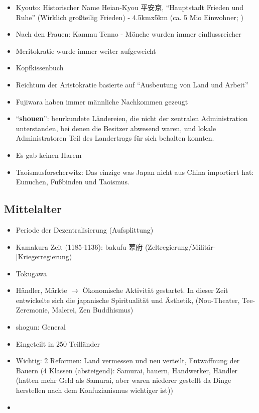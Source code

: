 \documentclass[emulatestandardclasses]{scrartcl}
\begin{document}
\begin{itemize}
  \item Kyouto: Historischer Name Heian-Kyou 平安京, "`Hauptstadt Frieden und Ruhe"' (Wirklich großteilig Frieden) - 4.5kmx5km (ca. 5 Mio Einwohner; )
  \item Nach den Frauen: Kammu Tenno - Mönche wurden immer einflussreicher
  \item Meritokratie wurde immer weiter aufgeweicht
  \item Kopfkissenbuch
  \item Reichtum der Aristokratie basierte auf "`Ausbeutung von Land und Arbeit"'
  \item Fujiwara haben immer männliche Nachkommen gezeugt
  \item "`\textbf{shouen}"': beurkundete Ländereien, die nicht der zentralen Administration unterstanden, bei denen die Besitzer abwesend waren, und lokale Administratoren Teil des Landertrags für sich behalten konnten.
  \item Es gab keinen Harem
  \item Taoismusforscherwitz: Das einzige was Japan nicht aus China importiert hat: Eunuchen, Fußbinden und Taoismus.
\end{itemize}

\subsection{Mittelalter}

\begin{itemize}
  \item Periode der Dezentralisierung (Aufsplittung)
  \item Kamakura Zeit (1185-1136): bakufu 幕府 (Zeltregierung/Militär-|Kriegerregierung)
  \item Tokugawa 
  \item Händler, Märkte $\rightarrow$ Ökonomische Aktivität gestartet. In dieser Zeit entwickelte sich die japanische Spiritualität und Ästhetik, (Nou-Theater, Tee-Zeremonie, Malerei, Zen Buddhismus)
  \item shogun: General
  \item Eingeteilt in 250 Teilländer
  \item Wichtig: 2 Reformen: Land vermessen und neu verteilt, Entwaffnung der Bauern (4 Klassen (absteigend): Samurai, bauern, Handwerker, Händler (hatten mehr Geld als Samurai, aber waren niederer gestellt da Dinge herstellen nach dem Konfuzianismus wichtiger ist))
  \item
\end{itemize}
\end{document}
